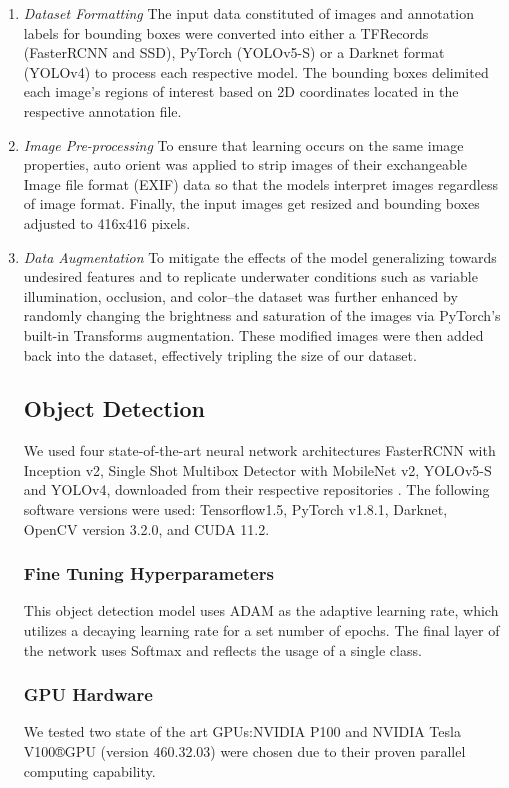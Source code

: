 \documentclass[a4paper,fleqn]{cas-dc}
\begin{document}
\begin{enumerate}[label={\alph*})]
\item \textit{Dataset Formatting} 
The input data constituted of images and annotation labels for bounding boxes were converted into either a TFRecords (FasterRCNN and SSD), PyTorch (YOLOv5-S) or a Darknet format (YOLOv4) to process each respective model. The bounding boxes delimited each image’s regions of interest based on 2D coordinates located in the respective annotation file.


\item \textit{Image Pre-processing} To ensure that learning occurs on the same image properties, auto orient was applied to strip images of their exchangeable Image file format (EXIF) data \cite{9108753} so that the models interpret images regardless of image format. Finally, the input images get resized and bounding boxes adjusted to 416x416 pixels.


\item \textit{Data Augmentation} To mitigate the effects of the model generalizing towards undesired features and to replicate underwater conditions such as variable illumination, occlusion, and color–the dataset was further enhanced by randomly changing the brightness and saturation of the images via PyTorch’s built-in Transforms augmentation. These modified images were then added back into the dataset, effectively tripling the size of our dataset.

\subsection{Object Detection}
We used four state-of-the-art neural network architectures FasterRCNN with Inception v2, Single Shot Multibox Detector with MobileNet v2, YOLOv5-S and YOLOv4, downloaded from their respective repositories . The following software versions were used: Tensorflow1.5, PyTorch v1.8.1, Darknet, OpenCV version 3.2.0, and CUDA 11.2.


\subsubsection{Fine Tuning Hyperparameters} 
This object detection model uses ADAM \cite{kingma2017adam} as the adaptive learning rate, which utilizes a decaying learning rate for a set number of epochs. The final layer of the network uses Softmax and reflects the usage of a single class.

\subsubsection{GPU Hardware}
We tested two state of the art GPUs:NVIDIA P100 and NVIDIA Tesla V100®GPU (version 460.32.03) were chosen due to their proven parallel computing capability.


\end{enumerate}
\end{document}
